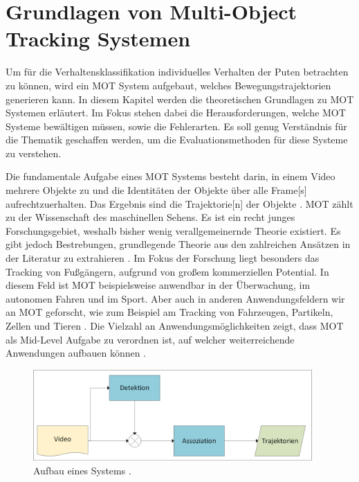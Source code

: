 \section{Grundlagen von Multi-Object Tracking Systemen} \label{sec:MOT Grundlagen}

Um für die Verhaltensklassifikation individuelles Verhalten der Puten betrachten zu können, wird ein \gls{MOT} System aufgebaut, welches Bewegungstrajektorien generieren kann. In diesem Kapitel werden die theoretischen Grundlagen zu \gls{MOT} Systemen erläutert. Im Fokus stehen dabei die Herausforderungen, welche \gls{MOT} Systeme bewältigen müssen, sowie die Fehlerarten. Es soll genug Verständnis für die Thematik geschaffen werden, um die Evaluationsmethoden für diese Systeme zu verstehen. 

Die fundamentale Aufgabe eines \gls{MOT} Systems besteht darin, in einem Video mehrere Objekte zu  und die Identitäten der Objekte über alle \gls{Frame}[s] aufrechtzuerhalten. Das Ergebnis sind die \gls{Trajektorie}[n] der Objekte \cite{CLEAR.2008, HOTA, Luo.2022}. \gls{MOT} zählt zu der Wissenschaft des maschinellen Sehens. Es ist ein recht junges Forschungsgebiet, weshalb bisher wenig verallgemeinernde Theorie existiert. Es gibt jedoch Bestrebungen, grundlegende Theorie aus den zahlreichen Ansätzen in der Literatur zu extrahieren \cite{Luo.2022}. Im Fokus der Forschung liegt besonders das Tracking von Fußgängern, aufgrund von großem kommerziellen Potential. In diesem Feld ist \gls{MOT} beispielsweise anwendbar in der Überwachung, im autonomen Fahren und im Sport. Aber auch in anderen Anwendungsfeldern wir an \gls{MOT} geforscht, wie zum Beispiel am Tracking von Fahrzeugen, Partikeln, Zellen und Tieren \cite{Luo.2022, CLEAR.2008, Crocker.1996}. Die Vielzahl an Anwendungsmöglichkeiten zeigt, dass \gls{MOT} als \gls{Mid-Level Aufgabe} zu verordnen ist, auf welcher weiterreichende Anwendungen aufbauen können \cite{Luo.2022}.\par

\begin{figure}[htbp]
\centering
\includegraphics[width=0.95\textwidth]{img/Grafiken/Detektionsbasiertes Tracking.png}
\caption{Aufbau eines  Systems \cite{Luo.2022}.}
\label{fig:DetBasedTrackSys}
\end{figure}

